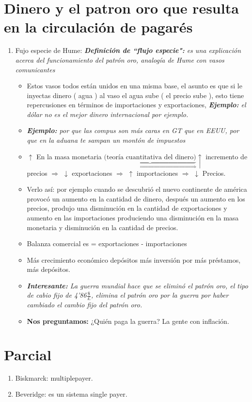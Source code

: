 \section{Dinero y el patron oro que resulta en la circulación de pagarés}
\begin{enumerate}
    \item Fujo especie de Hume: \emph{\textbf{Definición de ``flujo especie":} es una explicación acerca del funcionamiento del patrón oro, analogía de Hume con vasos comunicantes}
        \begin{itemize}
            \item Estos vasos todos están unidos en una misma base, el asunto es que si le inyectas dinero ( agua ) al vaso el agua sube ( el precio sube ), esto tiene repercusiones en términos de importaciones y exportaciones, \emph{\textbf{Ejemplo: }el dólar no es el mejor dinero internacional por ejemplo.}
            \item \emph{\textbf{Ejemplo: }por que las compus son más caras en GT que en EEUU, por que en la aduana te sampan un montón de impuestos}
            \item $\uparrow$ En la masa monetaria $ \underbrace{\text{(teoría cuantitativa del dinero)}}_{\Rightarrow} \uparrow$ incremento de precios $\Rightarrow$ $\downarrow $ exportaciones $\Rightarrow$ $\uparrow $ importaciones $\Rightarrow$  $\downarrow $ Precios.
            \item Verlo así: por ejemplo cuando se descubrió el nuevo continente de américa provocó un aumento en la cantidad de dinero, después un aumento en los precios, produjo una disminución en la cantidad de exportaciones y aumento en las importaciones produciendo una disminución en la masa monetaria y disminución en la cantidad de precios.
            \item Balanza comercial es = exportaciones - importaciones 
            \item Más crecimiento económico depósitos más inversión por más préstamos, más depósitos.
            \item \emph{\textbf{Interesante:} La guerra mundial hace que se eliminó el patrón oro, el tipo de cabio fijo de 4'86$\frac{\$}{\pounds} $, elimina el patrón oro por la guerra por haber cambiado el cambio fijo del patrón oro.}
            \item \textbf{Nos preguntamos:} ¿Quién paga la guerra? La gente con inflación.
        \end{itemize}
\end{enumerate}

\section{Parcial}
\begin{enumerate}
    \item Biskmarck: multiplepayer.
    \item Beveridge: es un sistema single payer.
\end{enumerate}
